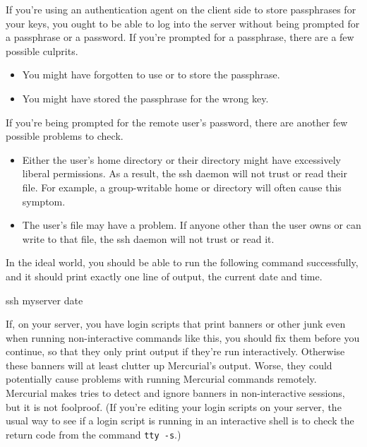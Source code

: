 If you're using an authentication agent on the client side to store
passphrases for your keys, you ought to be able to log into the server
without being prompted for a passphrase or a password.  If you're
prompted for a passphrase, there are a few possible culprits.
\begin{itemize}
\item You might have forgotten to use  or
   to store the passphrase.
\item You might have stored the passphrase for the wrong key.
\end{itemize}
If you're being prompted for the remote user's password, there are
another few possible problems to check.
\begin{itemize}
\item Either the user's home directory or their 
  directory might have excessively liberal permissions.  As a result,
  the ssh daemon will not trust or read their
   file.  For example, a group-writable
  home or  directory will often cause this symptom.
\item The user's  file may have a problem.
  If anyone other than the user owns or can write to that file, the
  ssh daemon will not trust or read it.
\end{itemize}

In the ideal world, you should be able to run the following command
successfully, and it should print exactly one line of output, the
current date and time.
\begin{codesample2}
  ssh myserver date
\end{codesample2}

If, on your server, you have login scripts that print banners or other
junk even when running non-interactive commands like this, you should
fix them before you continue, so that they only print output if
they're run interactively.  Otherwise these banners will at least
clutter up Mercurial's output.  Worse, they could potentially cause
problems with running Mercurial commands remotely.  Mercurial makes
tries to detect and ignore banners in non-interactive 
sessions, but it is not foolproof.  (If you're editing your login
scripts on your server, the usual way to see if a login script is
running in an interactive shell is to check the return code from the
command \Verb|tty -s|.)

